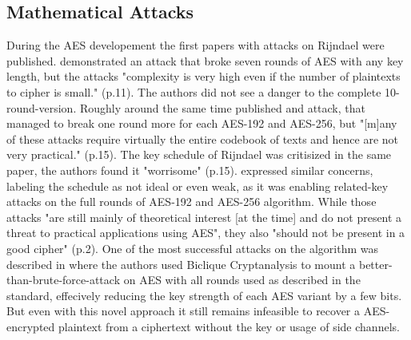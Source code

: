 \subsection{Mathematical Attacks}
\label{ch:mathematicalattacks}

During the AES developement the first papers with attacks on Rijndael were published. \cite{Gilbert00acollision} demonstrated an attack that broke seven rounds of AES with any key length, but the attacks "complexity is very high even if the number of plaintexts to cipher is small." (p.11). The authors did not see a danger to the complete 10-round-version.
Roughly around the same time \cite{impcryptan} published and attack, that managed to break one round more for each AES-192 and AES-256, but "[m]any of these attacks require virtually the entire codebook of texts and hence are not very practical." (p.15).
The key schedule of Rijndael was critisized in the same paper, the authors found it "worrisome" (p.15). \cite{rkeyattack} expressed similar concerns, labeling the schedule as not ideal or even weak, as it was enabling related-key attacks on the full rounds of AES-192 and AES-256 algorithm.  While those attacks "are still mainly of theoretical interest [at the time] and do not present a threat to practical applications using AES"\cite{rkeyattack2}, they also "should not be present in a good cipher" (p.2). %
One of the most successful attacks on the algorithm was described in \cite{biclique} where the authors used Biclique Cryptanalysis to mount a better-than-brute-force-attack on AES with all rounds used as described in the standard, effecively reducing the key strength of each AES variant by a few bits. But even with this novel approach it still remains infeasible to recover a AES-encrypted plaintext from a ciphertext without the key or usage of side channels.
